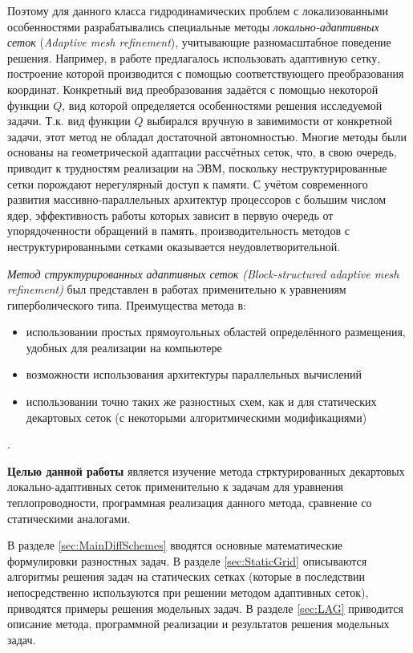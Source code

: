 Поэтому для данного класса гидродинамических проблем с локализованными особенностями разрабатывались специальные методы \emph{локально\hyp адаптивных сеток} (\emph{Adaptive mesh refinement}), учитывающие разномасштабное поведение решения.
Например, в работе \cite{СамарскийАдаптивные} предлагалось использовать адаптивную сетку, построение которой производится с помощью соответствующего преобразования координат.
Конкретный вид преобразования задаётся с помощью некоторой функции $Q$, вид которой определяется особенностями решения исследуемой задачи.
Т.к. вид функции $Q$ выбирался вручную в завимимости от конкретной задачи, этот метод не обладал достаточной автономностью.
Многие методы были основаны на геометрической адаптации рассчётных сеток, что, в свою очередь, приводит к трудностям реализации на ЭВМ, поскольку неструктурированные сетки порождают нерегулярный доступ к памяти.
С учётом современного развития массивно-параллельных архитектур процессоров с большим числом ядер, эффективность работы которых зависит в первую очередь от упорядоченности обращений в память, производительность методов с неструктурированными сетками оказывается неудовлетворительной.

\emph{Метод структурированных адаптивных сеток (Block-structured adaptive mesh refinement)} был представлен в работах \cite{berger1982adaptive, berger1989local} применительно к уравнениям гиперболического типа.
Преимущества метода в:
\begin{itemize}
    \item использовании простых прямоугольных областей определённого размещения, удобных для реализации на компьютере
    \item возможности использования архитектуры параллельных вычислений
    \item использовании точно таких же разностных схем, как и для статических декартовых сеток (с некоторыми алгоритмическими модификациями)
\end{itemize}.

\textbf{Целью данной работы} является изучение метода стрктурированных декартовых локально-адаптивных сеток применительно к задачам для уравнения теплопроводности, программная реализация данного метода, сравнение со статическими аналогами.

В разделе \ref{sec:MainDiffSchemes} вводятся основные математические формулировки разностных задач.
В разделе \ref{sec:StaticGrid} описываются алгоритмы решения задач на статических сетках (которые в последствии непосредственно используются при решении методом адаптивных сеток), приводятся примеры решения модельных задач.
В разделе \ref{sec:LAG} приводится описание метода, программной реализации и результатов решения модельных задач.